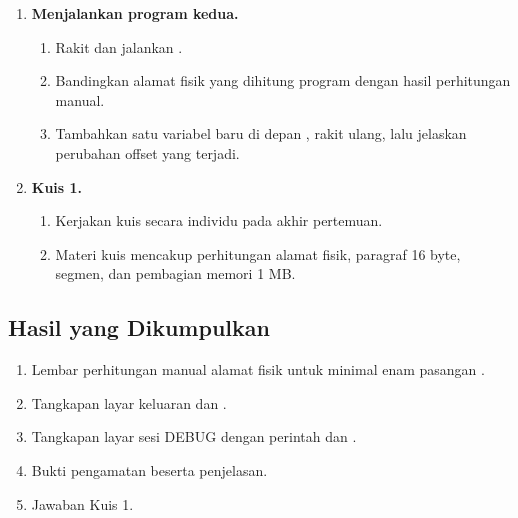 \begin{enumerate}
    \item \textbf{Menjalankan program kedua.}
    \begin{enumerate}
        \item Rakit dan jalankan .
        \item Bandingkan alamat fisik yang dihitung program dengan
              hasil perhitungan manual.
        \item Tambahkan satu variabel baru di depan ,
              rakit ulang, lalu jelaskan perubahan offset yang
              terjadi.
    \end{enumerate}

    \item \textbf{Kuis 1.}
    \begin{enumerate}
        \item Kerjakan kuis secara individu pada akhir pertemuan.
        \item Materi kuis mencakup perhitungan alamat fisik,
              paragraf 16 byte,  segmen, dan
              pembagian memori 1 MB.
    \end{enumerate}
\end{enumerate}

\subsection{Hasil yang Dikumpulkan}

\begin{enumerate}
    \item Lembar perhitungan manual alamat fisik untuk minimal enam
          pasangan .
    \item Tangkapan layar keluaran  dan
          .
    \item Tangkapan layar sesi DEBUG dengan perintah  dan
          .
    \item Bukti pengamatan  beserta penjelasan.
    \item Jawaban Kuis 1.
\end{enumerate}

